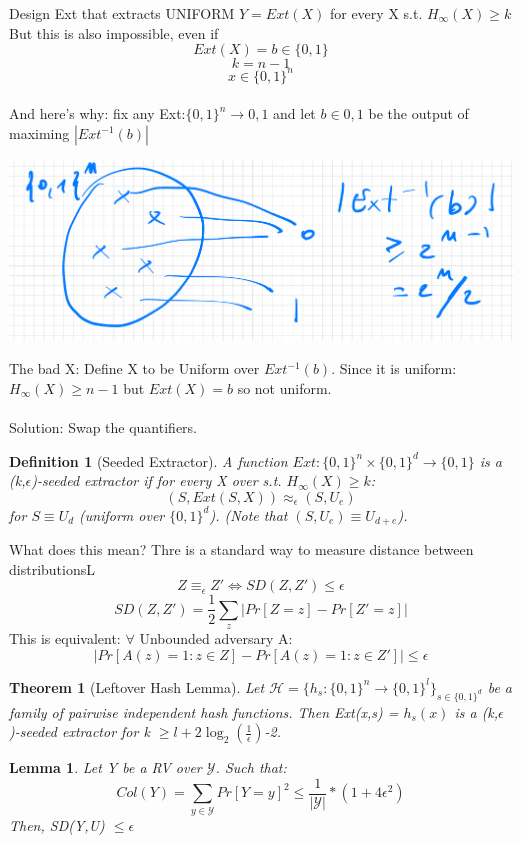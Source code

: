 \documentclass[11pt, a4paper]{article}
\newtheorem{thm}{Theorem}
\newtheorem{defn}{Definition}
\newtheorem{lem}{Lemma}
\begin{document}
Design Ext that extracts UNIFORM $Y=Ext(X)$ for every X s.t. $H_\infty (X) \geq k$\\
But this is also impossible, even if $$Ext(X)= b \in \{0,1\}$$ $$k = n-1$$ $$x \in \{0,1\}^n$$\\
And here's why: fix any Ext:$\{0,1\}^n \rightarrow {0,1}$ and let $b \in {0,1}$ be the output of maximing $|Ext^{-1}(b)|$\\
\begin{center}
    \includegraphics[scale=0.3]{img/expl.png}
\end{center}
The bad X: Define X to be Uniform over $Ext^{-1}(b)$. Since it is uniform: $H_\infty(X) \geq n-1$ but $Ext(X) = b$ so not uniform.\\\\
Solution: Swap the quantifiers.
\begin{defn}[Seeded Extractor]
    A function $Ext: \{0,1\}^n \times \{0,1\}^d \rightarrow \{0,1\}$ is a (k,$\epsilon$)-seeded extractor if for every X over s.t. $H_\infty(X) \geq k$: $$(S,Ext(S,X)) \approx_\epsilon (S,U_e)$$
    for $S \equiv U_d$ (uniform over $\{0,1\}^d$). (Note that $(S,U_e) \equiv U_{d+e}$).
\end{defn}
What does this mean? Thre is a standard way to measure distance between distributionsL
$$ Z \equiv_\epsilon Z' \iff SD(Z,Z') \leq \epsilon$$
$$ SD(Z,Z') = \frac{1}{2} \sum_{z} |Pr[Z=z] - Pr[Z'=z]|$$
This is equivalent: $\forall$ Unbounded adversary A:
$$|Pr[A(z)=1 : z \in Z] - Pr[A(z)=1 : z \in Z']| \leq \epsilon$$
\begin{thm}[Leftover Hash Lemma]
    Let $\mathcal{H} = \{h_s: \{0,1\}^n \rightarrow \{0,1\}^l\}_{s \in \{0,1\}^d}$ be a family of pairwise independent hash functions. Then Ext(x,s) = $h_s(x)$ is a (k,$\epsilon$)-seeded extractor for k $\geq l + 2\log_2(\frac{1}{\epsilon})$-2.

\end{thm}
\begin{lem}
    Let Y be a RV over $\mathcal{Y}$. Such that:
    $$Col(Y) = \sum_{y \in \mathcal{Y}} Pr[Y=y]^2 \leq \frac{1}{|\mathcal{Y}|} * (1 + 4\epsilon^2)$$
    Then, SD(Y,U) $\leq \epsilon$
\end{lem}
\end{document}
